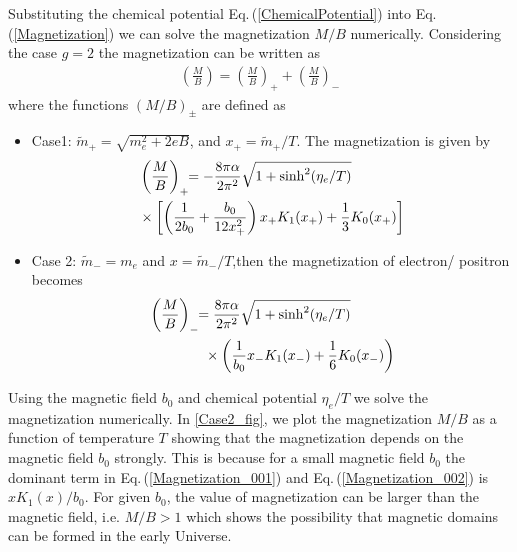 \documentclass[twocolumn,preprintnumbers,amsmath,amssymb]{revtex4-2}
\newcommand{\req}[1]{Eq.\,({\ref{#1}})}
\begin{document}
Substituting the chemical potential \req{ChemicalPotential} into \req{Magnetization} we can solve the magnetization $M/B$ numerically.
Considering the case $g=2$ the magnetization can be written as 
\begin{align}
\left(\frac{M}{B}\right)=\left(\frac{M}{B}\right)_++\left(\frac{M}{B}\right)_-
\end{align}
where the functions $(M/B)_\pm$ are defined as 
\begin{itemize}
 \item Case1: $\tilde m_+=\sqrt{m^2_e+2eB}$, and $x_+=\tilde m_+/T$. The magnetization is given by
\begin{align}\label{Magnetization_001}
 &\left(\frac{M}{B}\right)_+\!\!=-\frac{8\pi\alpha}{2\pi^2}\sqrt{1+\sinh^2(\eta_e/T)}\notag\\
 &\times\left[\left(\frac{1}{2b_0}+\frac{b_0}{12x_+^2}\right)x_+K_1(x_+)+\frac{1}{3}K_0(x_+)\right]
\end{align}
 \item Case 2: $\tilde m_-=m_e$ and $x=\tilde m_-/T$,then the magnetization of electron/ positron becomes
\begin{align}\label{Magnetization_002}
&\left(\frac{M}{B}\right)_-\!\!=\frac{8\pi\alpha}{2\pi^2}\sqrt{1+\sinh^2(\eta_e/T)}\notag\\
&\qquad\qquad\times\left(\frac{1}{b_0}x_-K_1(x_-)+\frac{1}{6}K_0(x_-)\right)
\end{align}
\end{itemize}
Using the magnetic field $b_0$ and chemical potential $\eta_e/T$ we solve the magnetization numerically. In \ref{Case2_fig}, we plot the magnetization $M/B$ as a function of temperature $T$ showing that the magnetization depends on the magnetic field $b_0$ strongly. This is because for a small magnetic field $b_0$ the dominant term in \req{Magnetization_001} and \req{Magnetization_002} is $xK_1(x)/b_0$. For given $b_0$, the value of magnetization can be larger than the magnetic field, i.e. $M/B>1$ which shows the possibility that magnetic domains can be formed in the early Universe.




\begin{thebibliography}{99}
\end{thebibliography}
\end{document}
